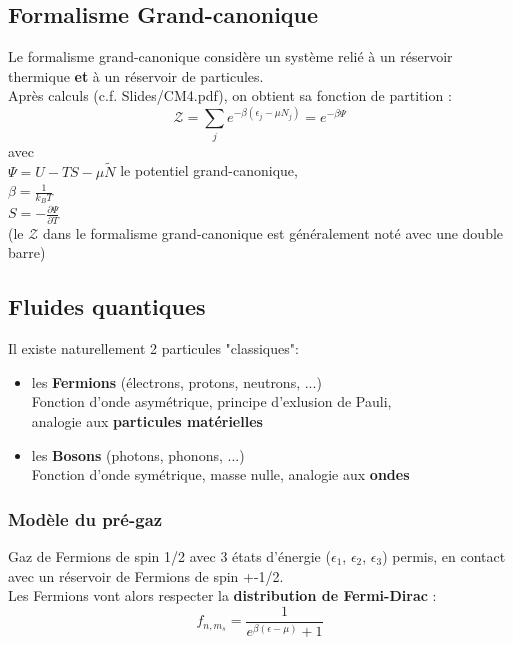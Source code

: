 \documentclass{article}
\begin{document}
    \subsection{Formalisme Grand-canonique}
        Le formalisme grand-canonique considère un système relié à un réservoir thermique \textbf{et} à un réservoir de particules.\\
        Après calculs (c.f. Slides/CM4.pdf), on obtient sa fonction de partition :
        $$
        \mathcal{Z} = \sum_{j} e^{-\beta (\epsilon_j - \mu N_j)} = e^{-\beta \Psi}
        $$
        avec\\
        $\Psi = U - TS - \mu \tilde N$ le potentiel grand-canonique,\\
        $\beta = \frac{1}{k_B T}$\\
        $S = - \frac{\partial \Psi}{\partial T}$\\
        (le $\mathcal{Z}$ dans le formalisme grand-canonique est généralement noté avec une double barre)
    
    \subsection{Fluides quantiques}
        Il existe naturellement 2 particules "classiques":
        \begin{itemize}
            \item les \textbf{Fermions} (électrons, protons, neutrons, ...)\\
            Fonction d'onde asymétrique, principe d'exlusion de Pauli,\\ analogie aux \textbf{particules matérielles}
            \item les \textbf{Bosons} (photons, phonons, ...)\\
            Fonction d'onde symétrique, masse nulle, analogie aux \textbf{ondes}
        \end{itemize}

        \subsubsection{Modèle du pré-gaz}
            Gaz de Fermions de spin 1/2 avec 3 états d'énergie ($\epsilon_1$, $\epsilon_2$, $\epsilon_3$) permis, en contact avec un réservoir de Fermions de spin +-1/2.\\
            Les Fermions vont alors respecter la \textbf{distribution de Fermi-Dirac} :
            $$
            f_{n,m_s} = \frac{1}{e^{\beta (\epsilon - \mu)} + 1}
            $$
\pagebreak
\end{document}
